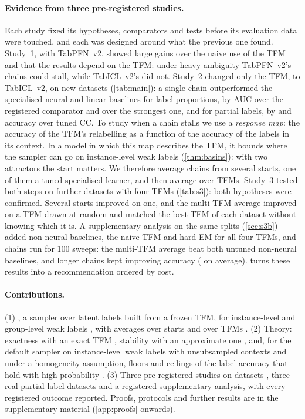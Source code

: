 \paragraph{Evidence from three pre-registered studies.} Each study fixed its hypotheses, comparators and tests before its
evaluation data were touched, and each was designed around what the previous one found. Study~1, with TabPFN~v2, showed
large gains over the naive use of the TFM and that the results depend on the TFM: under heavy ambiguity TabPFN~v2's
chains could stall, while TabICL~v2's did not. Study~2 changed only the TFM, to TabICL~v2, on  new datasets
(\cref{tab:main}): a single chain outperformed the specialised neural and linear baselines for label proportions, by
 AUC over the registered comparator and  over the strongest one, and for
partial labels, by  and  accuracy over tuned CC. To study when a chain stalls we use a \emph{response map}:
the accuracy of the TFM's relabelling as a function of the accuracy of the labels in its context. In a model in which
this map describes the TFM, it bounds where the sampler can go on instance-level weak labels (\cref{thm:basins}): with
two attractors the start matters. We therefore average chains from several starts, one of them a tuned specialised learner, and then
average over TFMs. Study~3 tested both steps on  further datasets with four TFMs (\cref{tab:s3}): both
hypotheses were confirmed. Several starts improved on one, and the multi-TFM average improved on a TFM drawn at random
and matched the best TFM of each dataset without knowing which it is. A supplementary analysis on the same splits (\cref{sec:s3b})
added non-neural baselines, the naive TFM and hard-EM for all four TFMs, and chains run for 100 sweeps: the
multi-TFM average beat both untuned non-neural baselines, and longer chains kept improving accuracy
( on average).  turns these results into a recommendation ordered by cost.

\paragraph{Contributions.} (1) \ours{}, a sampler over latent labels built from a frozen TFM, for instance-level and
group-level weak labels , with averages over starts and over TFMs . (2) Theory: exactness
with an exact TFM , stability with an approximate one , and, for the default sampler on instance-level weak
labels with unsubsampled contexts and under a homogeneity assumption, floors and ceilings of the label accuracy that
hold with high probability . (3) Three pre-registered
studies on  datasets , three real partial-label datasets
 and a registered supplementary analysis, with every registered outcome reported. Proofs, protocols and
further results are in the supplementary material (\cref{app:proofs} onwards).
